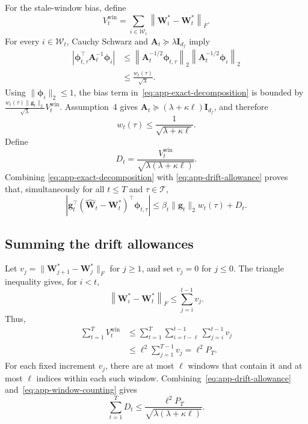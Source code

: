 For the stale-window bias, define
\[
    V_t^{\mathrm{win}}=\sum_{i\in\mathcal{W}_t}\left\lVert\mathbf{W}_i^*-\mathbf{W}_t^*\right\rVert_F.
\]
For every \(i\in\mathcal{W}_t\), Cauchy Schwarz and \(\mathbf{A}_t\succeq\lambda\mathbf{I}_{d_f}\) imply
\begin{align*}
\left|\boldsymbol{\phi}_{t,\tau}^{\top}\mathbf{A}_t^{-1}\boldsymbol{\phi}_{i}\right|
&\leq\left\lVert\mathbf{A}_t^{-1/2}\boldsymbol{\phi}_{t,\tau}\right\rVert_2
\left\lVert\mathbf{A}_t^{-1/2}\boldsymbol{\phi}_{i}\right\rVert_2 \\
&\leq\frac{w_t(\tau)}{\sqrt{\lambda}}.
\end{align*}
Using \(\lVert\boldsymbol{\phi}_i\rVert_2\leq1\), the bias term in~\eqref{eq:app-exact-decomposition} is bounded by
\(
    \frac{w_t(\tau)\lVert\mathbf{g}_t\rVert_2}{\sqrt{\lambda}}V_t^{\mathrm{win}}.
\)
Assumption~4 gives \(\mathbf{A}_t\succeq(\lambda+\kappa\ell)\mathbf{I}_{d_f}\), and therefore
\begin{equation}
    w_t(\tau)\leq\frac{1}{\sqrt{\lambda+\kappa\ell}}.
    \label{eq:app-uniform-width}
\end{equation}
Define
\begin{equation}
    D_t=\frac{V_t^{\mathrm{win}}}{\sqrt{\lambda(\lambda+\kappa\ell)}}.
    \label{eq:app-drift-allowance}
\end{equation}
Combining \eqref{eq:app-exact-decomposition} with \eqref{eq:app-drift-allowance} proves that, simultaneously for all \(t\leq T\) and \(\tau\in\mathcal{T}\),
\begin{equation}
\left|\mathbf{g}_t^{\top}(\widehat{\mathbf{W}}_t-\mathbf{W}_t^*)^{\top}\boldsymbol{\phi}_{t,\tau}\right|
\leq\beta_t\lVert\mathbf{g}_t\rVert_2w_t(\tau)+D_t.
\label{eq:app-uniform-prediction-bound}
\end{equation}

\subsection{Summing the drift allowances}

Let \(v_j=\lVert\mathbf{W}_{j+1}^*-\mathbf{W}_j^*\rVert_F\) for \(j\geq1\), and set \(v_j=0\) for \(j\leq0\). The triangle inequality gives, for \(i<t\),
\[
    \left\lVert\mathbf{W}_i^*-\mathbf{W}_t^*\right\rVert_F\leq\sum_{j=i}^{t-1}v_j.
\]
Thus,
\begin{align}
\sum_{t=1}^{T}V_t^{\mathrm{win}}
&\leq\sum_{t=1}^{T}\sum_{i=t-\ell}^{t-1}\sum_{j=i}^{t-1}v_j \\
&\leq\ell^2\sum_{j=1}^{T-1}v_j
=\ell^2P_T.
\label{eq:app-window-counting}
\end{align}
For each fixed increment \(v_j\), there are at most \(\ell\) windows that contain it and at most \(\ell\) indices within each such window. Combining~\eqref{eq:app-drift-allowance} and~\eqref{eq:app-window-counting} gives
\begin{equation}
    \sum_{t=1}^{T}D_t\leq\frac{\ell^2P_T}{\sqrt{\lambda(\lambda+\kappa\ell)}}.
    \label{eq:app-drift-sum}
\end{equation}

